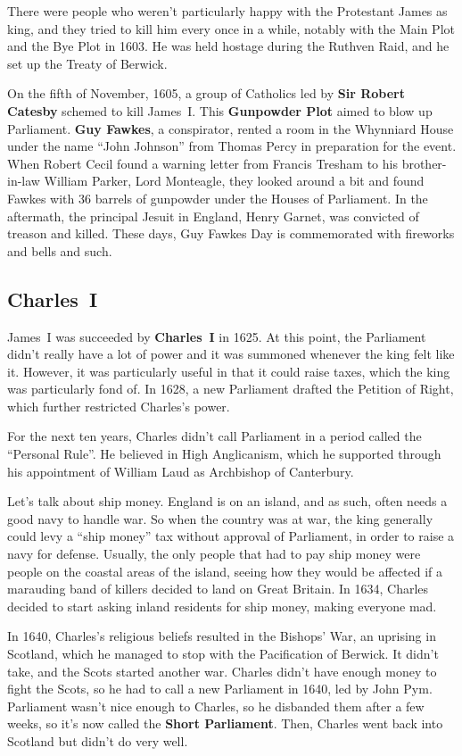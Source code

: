 There were people who weren't particularly happy with the Protestant James as king,
and they tried to kill him every once in a while, notably with the Main Plot and the Bye Plot in 1603.
He was held hostage during the Ruthven Raid, and he set up the Treaty of Berwick.

On the fifth of November, 1605, a group of Catholics led by \textbf{Sir Robert Catesby} schemed to kill James~I.
This \textbf{Gunpowder Plot} aimed to blow up Parliament.
\textbf{Guy Fawkes}, a conspirator, rented a room in the Whynniard House
under the name ``John Johnson'' from Thomas Percy in preparation for the event.
When Robert Cecil found a warning letter from Francis Tresham to his brother-in-law William Parker, Lord Monteagle,
they looked around a bit and found Fawkes with 36 barrels of gunpowder under the Houses of Parliament.
In the aftermath, the principal Jesuit in England, Henry Garnet, was convicted of treason and killed.
These days, Guy Fawkes Day is commemorated with fireworks and bells and such.

\subsection*{Charles~I}

James~I was succeeded by \textbf{Charles~I} in 1625.
At this point, the Parliament didn't really have a lot of power and it was summoned whenever the king felt like it.
However, it was particularly useful in that it could raise taxes, which the king was particularly fond of.
In 1628, a new Parliament drafted the Petition of Right, which further restricted Charles's power.

For the next ten years, Charles didn't call Parliament in a period called the ``Personal Rule''.
He believed in High Anglicanism,
which he supported through his appointment of William Laud as Archbishop of Canterbury.

Let's talk about ship money.
England is on an island, and as such, often needs a good navy to handle war.
So when the country was at war, the king generally could levy a ``ship money'' tax without approval of Parliament,
in order to raise a navy for defense.
Usually, the only people that had to pay ship money were people on the coastal areas of the island,
seeing how they would be affected if a marauding band of killers decided to land on Great Britain.
In 1634, Charles decided to start asking inland residents for ship money, making everyone mad.

In 1640, Charles's religious beliefs resulted in the Bishops' War, an uprising in Scotland,
which he managed to stop with the Pacification of Berwick.
It didn't take, and the Scots started another war.
Charles didn't have enough money to fight the Scots,
so he had to call a new Parliament in 1640, led by John Pym.
Parliament wasn't nice enough to Charles, so he disbanded them after a few weeks,
so it's now called the \textbf{Short Parliament}.
Then, Charles went back into Scotland but didn't do very well.

